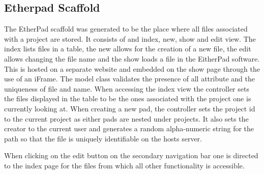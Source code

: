\documentclass[a4wide, 11pt]{article}
\begin{document}
\subsection{Etherpad Scaffold}
The EtherPad scaffold was generated to be the place where all files associated with a project are stored. It consists of and index, new, show and edit view. The index lists files in a table, the new allows for the creation of a new file, the edit allows changing the file name and the show loads a file in the EitherPad software. This is hosted on a separate website and embedded on the show page through the use of an iFrame. The model class validates the presence of all attribute and the uniqueness of file and name. When accessing the index view the controller sets the files displayed in the table to be the ones associated with the project one is currently looking at. When creating a new pad, the controller sets the project id to the current project as either pads are nested under projects. It also sets the creator to the current user and generates a random alpha-numeric string for the path so that the file is uniquely identifiable on the hosts server. 

When clicking on the edit button on the secondary navigation bar one is directed to the index page for the files from which all other functionality is accessible. 
\end{document}
